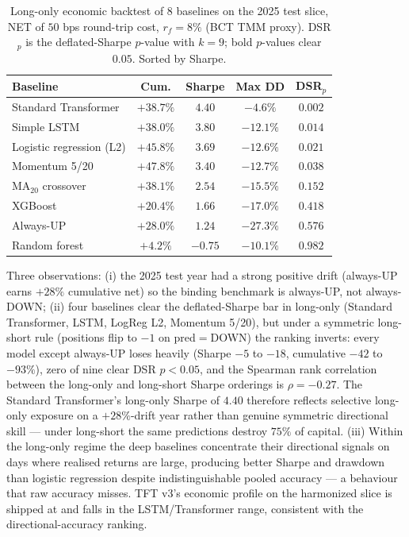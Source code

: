 \documentclass[conference]{IEEEtran}
\begin{document}
\begin{table}[htbp]
\centering
\caption{Long-only economic backtest of 8 baselines on the 2025 test slice, NET of $50$ bps round-trip cost, $r_f = 8\%$ (BCT TMM proxy). DSR$_p$ is the deflated-Sharpe $p$-value with $k = 9$; bold $p$-values clear $0.05$. Sorted by Sharpe.}
\label{tab:economic}
\scriptsize
\setlength{\tabcolsep}{4pt}
\begin{tabular}{lcccc}
\toprule
\textbf{Baseline} & \textbf{Cum.} & \textbf{Sharpe} & \textbf{Max DD} & \textbf{DSR$_p$} \\
\midrule
Standard Transformer            & $+38.7\%$ & $\mathbf{4.40}$ & $\mathbf{-4.6\%}$ & $\mathbf{0.002}$ \\
Simple LSTM                     & $+38.0\%$ & $3.80$ & $-12.1\%$ & $\mathbf{0.014}$ \\
Logistic regression (L2)        & $\mathbf{+45.8\%}$ & $3.69$ & $-12.6\%$ & $\mathbf{0.021}$ \\
Momentum 5/20                   & $+47.8\%$ & $3.40$ & $-12.7\%$ & $\mathbf{0.038}$ \\
MA$_{20}$ crossover             & $+38.1\%$ & $2.54$ & $-15.5\%$ & $0.152$ \\
XGBoost                          & $+20.4\%$ & $1.66$ & $-17.0\%$ & $0.418$ \\
Always-UP                        & $+28.0\%$ & $1.24$ & $-27.3\%$ & $0.576$ \\
Random forest                    & $+4.2\%$  & $-0.75$ & $-10.1\%$ & $0.982$ \\
\bottomrule
\end{tabular}
\end{table}

Three observations: (i) the 2025 test year had a strong positive drift (always-UP earns $+28\%$ cumulative net) so the binding benchmark is always-UP, not always-DOWN; (ii) four baselines clear the deflated-Sharpe bar in long-only (Standard Transformer, LSTM, LogReg L2, Momentum 5/20), but under a symmetric long-short rule (positions flip to $-1$ on pred$=$DOWN) the ranking inverts: every model except always-UP loses heavily (Sharpe $-5$ to $-18$, cumulative $-42$ to $-93\%$), zero of nine clear DSR $p<0.05$, and the Spearman rank correlation between the long-only and long-short Sharpe orderings is $\rho=-0.27$. The Standard Transformer's long-only Sharpe of $4.40$ therefore reflects selective long-only exposure on a $+28\%$-drift year rather than genuine symmetric directional skill --- under long-short the same predictions destroy $75\%$ of capital. (iii) Within the long-only regime the deep baselines concentrate their directional signals on days where realised returns are large, producing better Sharpe and drawdown than logistic regression despite indistinguishable pooled accuracy --- a behaviour that raw accuracy misses. TFT v3's economic profile on the harmonized slice is shipped at  and falls in the LSTM/Transformer range, consistent with the directional-accuracy ranking.
\end{document}
